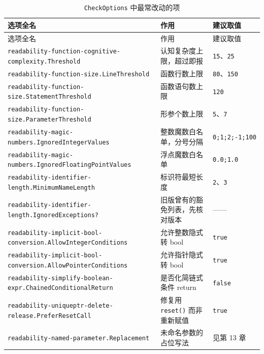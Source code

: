 \documentclass[12pt,a4paper,fontset=fandol]{ctexbook}
\begin{document}
{\footnotesize
\begin{longtable}{@{}>{\raggedright\arraybackslash}p{}
                  >{\raggedright\arraybackslash}p{}
                  >{\raggedright\arraybackslash}p{}@{}}
\caption{\texttt{CheckOptions} 中最常改动的项}\label{tab:appA-opt}\\
\toprule
选项全名 & 作用 & 建议取值 \\
\midrule
\endfirsthead
\toprule
选项全名 & 作用 & 建议取值 \\
\midrule
\endhead
\bottomrule
\endlastfoot
\texttt{readability-function-\allowbreak cognitive-complexity.\allowbreak Threshold} & 认知复杂度上限，超过即报 & \texttt{15}、\texttt{25} \\
\texttt{readability-function-size.\allowbreak LineThreshold} & 函数行数上限 & \texttt{80}、\texttt{150} \\
\texttt{readability-function-size.\allowbreak StatementThreshold} & 函数语句数上限 & \texttt{120} \\
\texttt{readability-function-size.\allowbreak ParameterThreshold} & 形参个数上限 & \texttt{5}、\texttt{7} \\
\texttt{readability-magic-numbers.\allowbreak IgnoredIntegerValues} & 整数魔数白名单，分号分隔 & \texttt{0;1;2;-1;100} \\
\texttt{readability-magic-numbers.\allowbreak IgnoredFloatingPointValues} & 浮点魔数白名单 & \texttt{0.0;1.0} \\
\texttt{readability-identifier-\allowbreak length.MinimumNameLength} & 标识符最短长度 & \texttt{2}、\texttt{3} \\
\texttt{readability-identifier-\allowbreak length.IgnoredExceptions?} & 旧版曾有的豁免列表，先核对版本 & —— \\
\texttt{readability-implicit-bool-\allowbreak conversion.\allowbreak AllowIntegerConditions} & 允许整数隐式转 bool & \texttt{true} \\
\texttt{readability-implicit-bool-\allowbreak conversion.\allowbreak AllowPointerConditions} & 允许指针隐式转 bool & \texttt{true} \\
\texttt{readability-simplify-boolean-\allowbreak expr.ChainedConditionalReturn} & 是否化简链式条件 return & \texttt{false} \\
\texttt{readability-uniqueptr-delete-\allowbreak release.PreferResetCall} & 修复用 \texttt{reset()} 而非重新赋值 & \texttt{true} \\
\texttt{readability-named-parameter.\allowbreak Replacement} & 未命名参数的占位写法 & 见第 13 章 \\

\end{longtable}}
\end{document}
